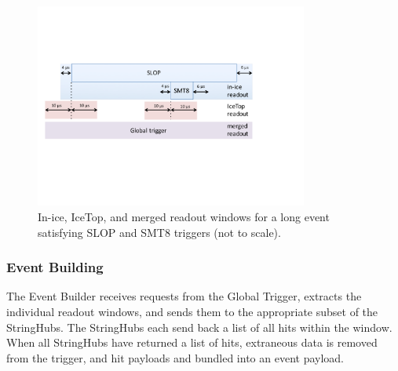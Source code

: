 \begin{figure}[!ht]
 \centering
 \includegraphics[width=0.8\textwidth]{graphics/online/trigger/trigger_readout}
 \caption{In-ice, IceTop, and merged readout windows for a long event
   satisfying SLOP and SMT8 triggers (not to scale).}
 \label{fig:trigger_readout}
\end{figure}


\subsubsection{\label{sect:online:evbuilder}Event Building}

The Event Builder receives requests from the Global Trigger, extracts the
individual readout windows, and sends them to the appropriate subset of the
StringHubs.  The StringHubs each send back a list of all hits within the
window.  When all StringHubs have returned a list of hits, extraneous data is
removed from the trigger, and hit payloads and bundled into an event payload.

